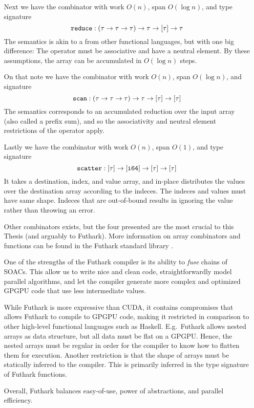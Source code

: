 Next we have the combinator  with work $O(n)$, span $O(\log n)$, and
type signature
\begin{equation}
\mathtt{reduce}:(\tau \to \tau \to \tau) \to \tau \to \mathtt{[}\tau\mathtt{]} \to \tau
\end{equation}
The semantics is akin to a  from other functional languages, but with
one big difference: The operator must be associative and have a neutral
element. By these assumptions, the array can be accumulated in $O(\log n)$
steps.

On that note we have the combinator  with work $O(n)$, span
$O(\log n)$, and signature
\begin{equation}
\mathtt{scan}:(\tau \to \tau \to \tau) \to \tau \to \mathtt{[}\tau\mathtt{]} \to \mathtt{[}\tau\mathtt{]}
\end{equation}
The semantics corresponds to an accumulated reduction over the input array (also
called a prefix sum), and so the associativity and neutral element restrictions
of the operator apply.

Lastly we have the combinator  with work $O(n)$, span $O(1)$, and
type signature
\begin{equation}
\mathtt{scatter}:\mathtt{[}\tau\mathtt{]} \to \mathtt{[}\mathtt{i64}\mathtt{]} \to \mathtt{[}\tau\mathtt{]} \to \mathtt{[}\tau\mathtt{]}
\end{equation}
It takes a destination, index, and value array, and in-place distributes the
values over the destination array according to the indeces. The indeces and
values must have same shape. Indeces that are out-of-bound results in ignoring
the value rather than throwing an error.

Other combinators exists, but the four presented are the most crucial to this
Thesis (and arguably to Futhark). More information on array combinators and
functions can be found in the Futhark standard library \cite{futprelude}.

One of the strengths of the Futhark compiler is its ability to \textit{fuse}
chains of SOACs. This allow us to write nice and clean code, straightforwardly
model parallel algorithms, and let the compiler generate more complex and
optimized GPGPU code that use less intermediate values.

While Futhark is more expressive than CUDA, it contains compromises that allows
Futhark to compile to GPGPU code, making it restricted in comparison to other
high-level functional languages such as Haskell. E.g.\ Futhark allows nested
arrays as data structure, but all data must be flat on a GPGPU. Hence, the
nested arrays must be regular in order for the compiler to know how to flatten
them for execution. Another restriction is that the shape of arrays must be
statically inferred to the compiler. This is primarily inferred in the type
signature of Futhark functions.

Overall, Futhark balances easy-of-use, power of abstractions, and parallel
efficiency.

